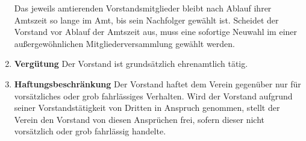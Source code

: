 \documentclass{scrartcl}
\begin{document}
\begin{enumerate}
                Das jeweils amtierenden Vorstandsmitglieder bleibt nach Ablauf ihrer Amtszeit so lange im Amt, bis
                sein Nachfolger gewählt ist. 
                Scheidet der Vorstand vor Ablauf der Amtszeit aus, muss eine sofortige Neuwahl im einer außergewöhnlichen Mitgliederversammlung gewählt werden.
            \item \textbf{Vergütung} \newline
                Der Vorstand ist grundsätzlich ehrenamtlich tätig.
            \item \textbf{Haftungsbeschränkung} \newline    
                Der Vorstand haftet dem Verein gegenüber nur für vorsätzliches oder grob
                fahrlässiges Verhalten. Wird der Vorstand aufgrund seiner Vorstandstätigkeit von
                Dritten in Anspruch genommen, stellt der Verein den Vorstand von
                diesen Ansprüchen frei, sofern dieser nicht vorsätzlich oder grob fahrlässig
                handelte.
        \end{enumerate}
\end{document}
